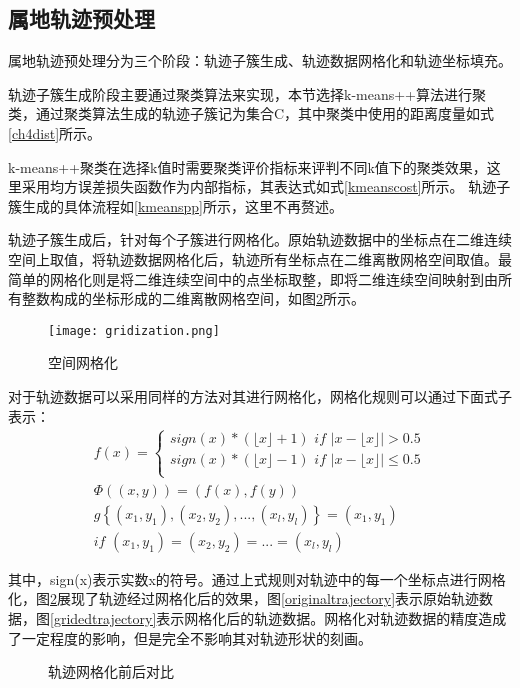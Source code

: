 \subsection{属地轨迹预处理}

属地轨迹预处理分为三个阶段：轨迹子簇生成、轨迹数据网格化和轨迹坐标填充。

轨迹子簇生成阶段主要通过聚类算法来实现，本节选择k-means++算法进行聚类，通过聚类算法生成的轨迹子簇记为集合C，其中聚类中使用的距离度量如式\ref{ch4dist}所示。

k-means++聚类在选择k值时需要聚类评价指标来评判不同k值下的聚类效果，这里采用均方误差损失函数作为内部指标，其表达式如式\ref{kmeanscost}所示。
轨迹子簇生成的具体流程如\ref{kmeanspp}所示，这里不再赘述。

轨迹子簇生成后，针对每个子簇进行网格化。原始轨迹数据中的坐标点在二维连续空间上取值，将轨迹数据网格化后，轨迹所有坐标点在二维离散网格空间取值。最简单的网格化则是将二维连续空间中的点坐标取整，即将二维连续空间映射到由所有整数构成的坐标形成的二维离散网格空间，如图\ref{gridization}所示。
\begin{figure}[H]
	\texttt{[image: gridization.png]}
	\caption{空间网格化}
	\label{gridization}
\end{figure}

对于轨迹数据可以采用同样的方法对其进行网格化，网格化规则可以通过下面式子表示：
$$
\begin{aligned}
f\left( x \right) =\left\{ \begin{array}{c}
	sign\left( x \right) *\left( \lfloor x \rfloor +1 \right) \,\,if\,\,|x-\lfloor x \rfloor |>0.5\\
	sign\left( x \right) *\left( \lfloor x \rfloor -1 \right) \,\,if\,\,|x-\lfloor x \rfloor |\leqslant 0.5\\
\end{array} \right.\\
\varPhi \left( \left( x,y \right) \right) =\left( f\left( x \right) ,f\left( y \right) \right)\\
g\left\{ \left( x_1,y_1 \right) ,\left( x_2,y_2 \right) ,...,\left( x_l,y_l \right) \right\} =\left( x_1,y_1 \right) \,\, \\
if\,\,\left( x_1,y_1 \right) =\left( x_2,y_2 \right) =...=\left( x_l,y_l \right)
\end{aligned}
$$


其中，sign(x)表示实数x的符号。通过上式规则对轨迹中的每一个坐标点进行网格化，图\ref{gridization}展现了轨迹经过网格化后的效果，图\ref{originaltrajectory}表示原始轨迹数据，图\ref{gridedtrajectory}表示网格化后的轨迹数据。网格化对轨迹数据的精度造成了一定程度的影响，但是完全不影响其对轨迹形状的刻画。
\begin{figure}[H]
\caption{轨迹网格化前后对比}
\label{gridization}
\end{figure}

